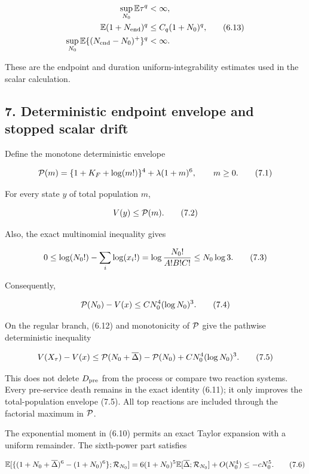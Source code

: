 \[
\begin{split}
 \sup_{N_0}\mathbb E\tau^q&<\infty,\\
 \mathbb E(1+N_{\rm end})^q&\le C_q(1+N_0)^q,\\
 \sup_{N_0}\mathbb E\{(N_{\rm end}-N_0)^+\}^q&<\infty.
\end{split}                                             \tag{6.13}
\]

These are the endpoint and duration uniform-integrability estimates used
in the scalar calculation.

\subsection{7. Deterministic endpoint envelope and stopped scalar
drift}

Define the monotone deterministic envelope

\[
 {\cal P}(m)
 =\{1+K_F+\log(m!)\}^4+\lambda(1+m)^6,\qquad m\ge0.    \tag{7.1}
\]

For every state \(y\) of total population \(m\),

\[
                              V(y)\le{\cal P}(m).       \tag{7.2}
\]

Also, the exact multinomial inequality gives

\[
 0\le\log(N_0!)-\sum_i\log(x_i!)
 =\log{N_0!\over A!B!C!}\le N_0\log3.                 \tag{7.3}
\]

Consequently,

\[
                     {\cal P}(N_0)-V(x)
                     \le C N_0^4(\log N_0)^3.          \tag{7.4}
\]

On the regular branch, (6.12) and monotonicity of \({\cal P}\) give the
pathwise deterministic inequality

\[
 V(X_\tau)-V(x)
 \le {\cal P}(N_0+\overline\Delta)-{\cal P}(N_0)
    +C N_0^4(\log N_0)^3.                              \tag{7.5}
\]

This does not delete \(D_{\rm pre}\) from the process or compare two
reaction systems. Every pre-service death remains in the exact identity
(6.11); it only improves the total-population envelope (7.5). All top
reactions are included through the factorial maximum in \({\cal P}\).

The exponential moment in (6.10) permits an exact Taylor expansion with
a uniform remainder. The sixth-power part satisfies

\[
 \mathbb E[\{(1+N_0+\overline\Delta)^6-(1+N_0)^6\};
             {\cal R}_{N_0}]
 =6(1+N_0)^5\mathbb E[\overline\Delta;{\cal R}_{N_0}]
   +O(N_0^4)
 \le-cN_0^5.                                          \tag{7.6}
\]

